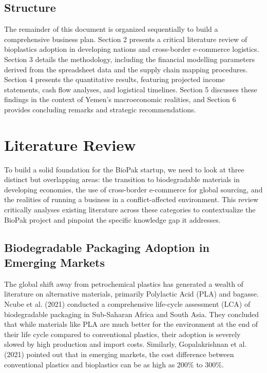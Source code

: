 \documentclass[12pt,a4paper]{article}
\begin{document}
\subsection{Structure}

The remainder of this document is organized sequentially to build a comprehensive business plan. Section 2 presents a critical literature review of bioplastics adoption in developing nations and cross-border e-commerce logistics. Section 3 details the methodology, including the financial modelling parameters derived from the spreadsheet data and the supply chain mapping procedures. Section 4 presents the quantitative results, featuring projected income statements, cash flow analyses, and logistical timelines. Section 5 discusses these findings in the context of Yemen's macroeconomic realities, and Section 6 provides concluding remarks and strategic recommendations.

\section{Literature Review}

To build a solid foundation for the BioPak startup, we need to look at three distinct but overlapping areas: the transition to biodegradable materials in developing economies, the use of cross-border e-commerce for global sourcing, and the realities of running a business in a conflict-affected environment. This review critically analyses existing literature across these categories to contextualize the BioPak project and pinpoint the specific knowledge gap it addresses.

\subsection{Biodegradable Packaging Adoption in Emerging Markets}

The global shift away from petrochemical plastics has generated a wealth of literature on alternative materials, primarily Polylactic Acid (PLA) and bagasse. Ncube et al. (2021) conducted a comprehensive life-cycle assessment (LCA) of biodegradable packaging in Sub-Saharan Africa and South Asia. They concluded that while materials like PLA are much better for the environment at the end of their life cycle compared to conventional plastics, their adoption is severely slowed by high production and import costs. Similarly, Gopalakrishnan et al. (2021) pointed out that in emerging markets, the cost difference between conventional plastics and bioplastics can be as high as 200\% to 300\%.
\end{document}
